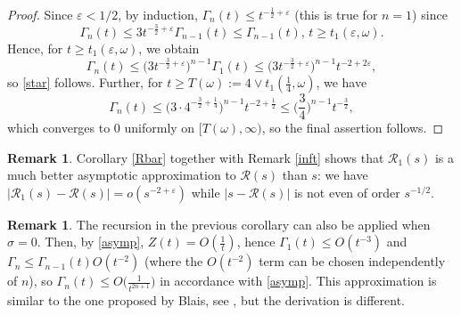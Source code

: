 \documentclass[sn-mathphys-num]{sn-jnl}
\theoremstyle{definition}
\newtheorem{rem}[thm]{Remark}
\newcommand{\scr}[1]{\mathscr #1}
\numberwithin{equation}{section} \theoremstyle{remark}
\renewcommand{\d}{\hbox{d}}
\def\d{\text{\rm{d}}} \def\bb{\beta} \def\aa{\alpha} \def\D{\scr D}
\def\RR{\mathscr R}
\newcommand{\1}{\mathbbm{1}}
\begin{document}
\begin{proof}
Since $\varepsilon<1/2$, by induction,
$\Gamma_{n}(t)\leq t^{-\frac 12 + \varepsilon}$ (this is true for
$n=1$) since
  $$
\Gamma_n(t)\leq 3t^{-\frac 32 +\varepsilon} \Gamma_{n-1}(t)\leq \Gamma_{n-1}(t),\, t \geq t_1(\varepsilon,\omega).
$$
Hence, for $t \geq t_1(\varepsilon,\omega)$, we obtain
$$
\Gamma_n(t)\leq \big(3t^{-\frac
  32+\varepsilon}\Big)^{n-1}\Gamma_1(t)\leq \big(3t^{-\frac
  32+\varepsilon}\big)^{n-1}t^{-2 +2\varepsilon},
$$
so \eqref{star} follows. Further, for
$t \geq T(\omega):=4\vee t_1(\frac 14,\omega)$, we have
$$
\Gamma_n(t)\leq \big(3 \cdot 4^{-\frac 32+\frac 14}\big)^{n-1}
t^{-2+\frac 12}\leq \Big(\frac 34\Big)^{n-1}t^{-\frac 32},
$$
which converges to 0 uniformly on $[T(\omega),\infty)$, so the final
assertion follows.
\end{proof}
%
%
\begin{rem}
Corollary \ref{Rbar} together with Remark \ref{inft} shows that $\RR_1(s)$ is a much better asymptotic approximation to $\RR(s)$ than $s$: we have $\big|\RR_1(s)-\RR(s)\big|=o(s^{-2+\varepsilon})$ while $\big|s-\RR(s)\big|$ is not even of order $s^{-1/2}$.
\end{rem}
  
\begin{rem}
  The recursion in the previous corollary can also be applied when $\sigma=0$. Then, by \eqref{asymp}, $Z(t)=O(\frac 1t)$, hence $\Gamma_1(t)\leq O(t^{-3})$ and $\Gamma_{n}\leq \Gamma_{n-1}(t) O(t^{-2})$
  (where the $O(t^{-2})$ term can be chosen independently of $n$), so $\Gamma_n(t)\leq O\big( \frac 1{t^{2n+1}}\big)$ in accordance with \eqref{asymp}. This approximation is similar to the one proposed by Blais, see \cite{Blais}, but the derivation is different.
\end{rem}
\end{document}
